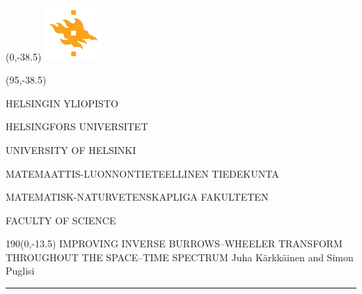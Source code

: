 \documentclass[a4paper]{article} %
\begin{document}
\pagestyle{empty} %




\begin{textblock}{95}(0,-38.5)
\includegraphics[width=22mm]{flame}
\end{textblock}	

\begin{textblock}{95}(95,-38.5)
{\fontsize{8}{7}\selectfont\sffamily\color{unigray}
\hfill HELSINGIN YLIOPISTO

\hfill HELSINGFORS UNIVERSITET

\hfill UNIVERSITY OF HELSINKI

\color{sciorange}\hfill MATEMAATTIS-LUONNONTIETEELLINEN TIEDEKUNTA

\hfill MATEMATISK-NATURVETENSKAPLIGA FAKULTETEN

\hfill FACULTY OF SCIENCE %


}
\end{textblock}


\begin{textblock}{190}(0,-13.5)
{\sffamily\LARGE{\color{sciorange}IMPROVING INVERSE }{\color{unigray}
BURROWS--WHEELER TRANSFORM\\THROUGHOUT THE SPACE--TIME SPECTRUM}}
\small\hfill Juha K\"arkk\"ainen and Simon Puglisi\\ %
\rule[2mm]{190mm}{0.3pt} %
\end{textblock}
\end{document}
